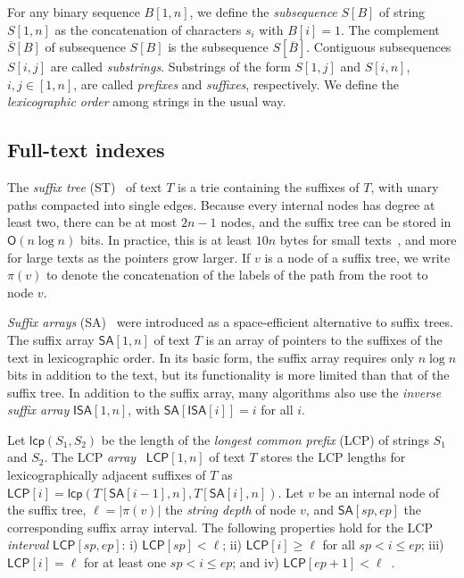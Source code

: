 \documentclass[a4paper,11pt]{llncs}
\newcommand{\abs}[1]{\ensuremath{\lvert #1 \rvert}}
\renewcommand{\complement}[1]{\ensuremath{\overline{ #1 }}}
\newcommand{\ST}{\textsf{ST}}
\newcommand{\SA}{\textsf{SA}}
\newcommand{\mSA}{\ensuremath{\mathsf{SA}}}
\newcommand{\mISA}{\ensuremath{\mathsf{ISA}}}
\newcommand{\LCP}{\textsf{LCP}}
\newcommand{\mLCP}{\ensuremath{\mathsf{LCP}}}
\newcommand{\mlcp}{\ensuremath{\mathsf{lcp}}}
\newcommand{\Oh}{\ensuremath{\mathsf{O}}}
\begin{document}
For any binary sequence $B[1,n]$, we define the \emph{subsequence} $S[B]$ of string $S[1,n]$ as the concatenation of characters $s_{i}$ with $B[i] = 1$. The complement $\complement{S}[B]$ of subsequence $S[B]$ is the subsequence $S[\complement{B}]$. Contiguous subsequences $S[i,j]$ are called \emph{substrings}. Substrings of the form $S[1,j]$ and $S[i,n]$, $i,j \in [1,n]$, are called \emph{prefixes} and \emph{suffixes}, respectively. We define the \emph{lexicographic order} among strings in the usual way.

\subsection{Full-text indexes}

The \emph{suffix tree} (\ST)~\cite{Weiner1973} of text $T$ is a trie containing the suffixes of $T$, with unary paths compacted into single edges. Because every internal nodes has degree at least two, there can be at most $2n-1$ nodes, and the suffix tree can be stored in $\Oh(n \log n)$ bits. In practice, this is at least $10n$ bytes for small texts~\cite{Kurtz1999}, and more for large texts as the pointers grow larger. If $v$ is a node of a suffix tree, we write $\pi(v)$ to denote the concatenation of the labels of the path from the root to node $v$.

\emph{Suffix arrays} (\SA)~\cite{Manber1993} were introduced as a space-efficient alternative to suffix trees. The suffix array $\mSA[1,n]$ of text $T$ is an array of pointers to the suffixes of the text in lexicographic order. In its basic form, the suffix array requires only $n \log n$ bits in addition to the text, but its functionality is more limited than that of the suffix tree. In addition to the suffix array, many algorithms also use the \emph{inverse suffix array} $\mISA[1,n]$, with $\mSA[\mISA[i]] = i$ for all $i$.

Let $\mlcp(S_{1}, S_{2})$ be the length of the \emph{longest common prefix} (\LCP) of strings $S_{1}$ and $S_{2}$. The \LCP{} \emph{array}~\cite{Manber1993} $\mLCP[1,n]$ of text $T$ stores the \LCP{} lengths for lexicographically adjacent suffixes of $T$ as $\mLCP[i] = \mlcp(T[\mSA[i-1],n], T[\mSA[i],n])$. Let $v$ be an internal node of the suffix tree, $\ell = \abs{\pi(v)}$ the \emph{string depth} of node $v$, and $\mSA[sp,ep]$ the corresponding suffix array interval. The following properties hold for the \LCP{} \emph{interval} $\mLCP[sp,ep]$: i) $\mLCP[sp] < \ell$; ii) $\mLCP[i] \ge \ell$ for all $sp < i \le ep$; iii) $\mLCP[i] = \ell$ for at least one $sp < i \le ep$; and iv) $\mLCP[ep+1] < \ell$~\cite{Abouelhoda2004}.
\end{document}
